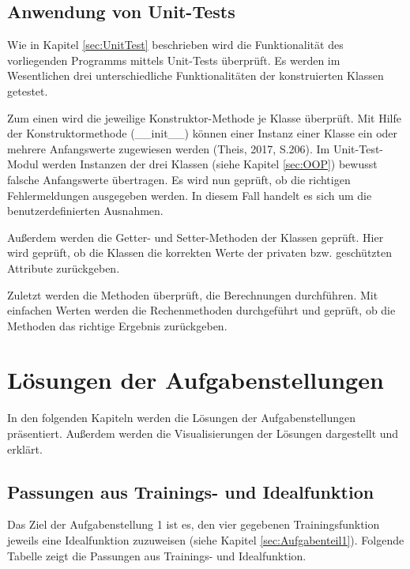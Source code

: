 \documentclass[
    a4paper, 								%
    oneside, 								%
    11pt, 									%
    listof=totoc, 					%
    bibliography=totoc, 		%
    final, 									%
    numbers=noenddot
]{scrreprt}
\begin{document}
\section{Anwendung von Unit-Tests}
Wie in Kapitel \ref{sec:UnitTest} beschrieben wird die Funktionalität des vorliegenden Programms mittels Unit-Tests überprüft. Es werden im Wesentlichen drei unterschiedliche Funktionalitäten der konstruierten Klassen getestet. 

Zum einen wird die jeweilige Konstruktor-Methode je Klasse überprüft. Mit Hilfe der Konstruktormethode (\_\_init\_\_) können  einer Instanz einer Klasse ein oder mehrere Anfangswerte zugewiesen werden (Theis, 2017, S.206). Im Unit-Test-Modul werden Instanzen der drei Klassen (siehe Kapitel \ref{sec:OOP}) bewusst falsche Anfangswerte übertragen. Es wird nun geprüft, ob die richtigen Fehlermeldungen ausgegeben werden. In diesem Fall handelt es sich um die benutzerdefinierten Ausnahmen. 

Außerdem werden die Getter- und Setter-Methoden der Klassen geprüft. Hier wird geprüft, ob die Klassen die korrekten Werte der privaten bzw. geschützten Attribute zurückgeben. 

Zuletzt werden die Methoden überprüft, die Berechnungen durchführen. Mit einfachen Werten werden die Rechenmethoden durchgeführt und geprüft, ob die Methoden das richtige Ergebnis zurückgeben. 
\chapter{Lösungen der Aufgabenstellungen}
\label{cha:Lösung}
In den folgenden Kapiteln werden die Lösungen der Aufgabenstellungen präsentiert. Außerdem werden die Visualisierungen der Lösungen dargestellt und erklärt. 

\section{Passungen aus Trainings- und Idealfunktion}
Das Ziel der Aufgabenstellung 1 ist es, den vier gegebenen Trainingsfunktion jeweils eine Idealfunktion zuzuweisen (siehe Kapitel \ref{sec:Aufgabenteil1}). Folgende Tabelle zeigt die Passungen aus Trainings- und Idealfunktion. 
\end{document}
